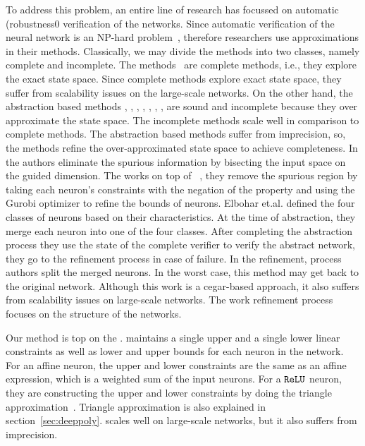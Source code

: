 To address this problem, an entire line of research has focussed on automatic (robustness0 verification of the networks. Since automatic verification of the neural network is an NP-hard problem~\cite{?}, therefore researchers use approximations in their methods. Classically, we may divide the methods into two classes, namely complete and incomplete. The methods~\cite{lomuscio2017approach,fischetti2018deep,dutta2018output,cheng2017maximum,katz2017reluplex,katz2019marabou,ehlers2017formal,huang2017safety,wang2021beta,xu2020fast,zhang2022general,alpha} are complete methods, i.e., they explore the exact state space.
Since complete methods explore exact state space, they suffer from scalability issues on the large-scale networks. On the other hand, the abstraction based methods \cite{dvijotham2018dual}, \cite{gehr2018ai2}, \cite{singh2018fast},
 \cite{singh2018boosting}, \cite{weng2018towards}, \cite{wong2018provable}, \cite{zhang2018efficient}, \cite{zhang2018efficient} are sound and incomplete because they over approximate the state space. The incomplete methods scale well in comparison to complete methods.  The abstraction based methods suffer from imprecision, so, the methods \cite{wang2018formal,wang2018efficient,elboher2020abstraction,yang2021improving,lin2020art} refine the over-approximated state space to achieve completeness. In \cite{wang2018formal,wang2018efficient,lin2020art} the authors eliminate the spurious information by bisecting the input space on the guided dimension. The \cite{yang2021improving} works on top of \deeppoly{}~\cite{singh2019abstract}, they remove
the spurious region by taking each neuron's constraints with the negation of the property and using the  Gurobi optimizer \cite{gurobioptimizer} to refine the bounds of neurons. Elbohar et.al. \cite{elboher2020abstraction} defined the four classes of neurons based on their characteristics. At the time of abstraction, they merge each neuron into one of the four classes.  After completing the abstraction process they use the state of the complete verifier to verify  the abstract network, they go to the refinement process in case of failure.   In the refinement, process authors split the merged neurons.  In the worst case, this method may get back to the original network.  Although this work is a cegar-based approach, it also suffers from scalability issues on large-scale networks.   The work \cite{elboher2020abstraction} refinement process focuses on the structure of the networks.

Our method is top on the \deeppoly{}.  \deeppoly{} maintains a single upper and a single lower linear constraints as well as lower and upper bounds
for each neuron in the network. For an affine neuron, the upper and lower constraints are the same as an affine expression,
which is a weighted sum of the input neurons. For a $\mathtt{ReLU}${} neuron, they are constructing the upper and lower constraints
by doing the triangle approximation~\cite{singh2019abstract}. 
Triangle approximation is also explained in section~\ref{sec:deeppoly}. 
\deeppoly{} scales well on large-scale networks, but it also suffers from imprecision. 

